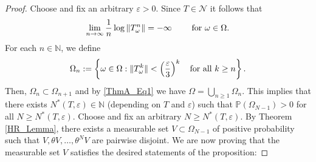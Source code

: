 \documentclass[pdflatex,sn-mathphys-num]{sn-jnl}%
\theoremstyle{thmstyleone}%
\theoremstyle{thmstyletwo}%
\theoremstyle{thmstylethree}%
\newcommand{\N}{\mathbb{N}}
\newcommand{\mP}{\mathbb{P}}
\newcommand{\eps}{\varepsilon}
\numberwithin{equation}{section}
\begin{document}
%
\begin{proof}
Choose and fix an arbitrary $\eps>0$. Since $T\in\mathcal N$ it follows that 
\begin{equation}\label{ThmA_Eq1}
\lim_{n\to\infty}\frac{1}{n}\log\|T_{\omega}^n\|=-\infty\qquad\hbox{ for } \omega \in \Omega.
\end{equation}
For each $n\in\N$, we define 
\begin{equation}\label{ThmA_Eq2}
\Omega_n:=\left\{\omega\in\Omega: \|T_{\omega}^k\|< \left(\frac{\eps}{3}\right)^k\quad \hbox{for all } k\geq n\right\}.
\end{equation}
Then, $\Omega_n\subset \Omega_{n+1}$ and by \eqref{ThmA_Eq1} we have $\Omega=\bigcup_{n\geq 1}\Omega_n$. This implies that there exists $N^*(T,\eps)\in\N$ (depending on $T$ and $\eps$) such that  $\mP(\Omega_{N-1})>0$ for all $N\geq N^*(T,\eps)$. Choose and fix an arbitrary $N\geq N^*(T,\eps)$. By Theorem \ref{HR_Lemma}, there exists a measurable set $V\subset \Omega_{N-1}$ of positive probability such that $V,\theta V,\dots, \theta^{N} V$ are pairwise disjoint.  We are now proving that the measurable set $V$ satisfies the desired statements of the proposition:


\end{proof}
\end{document}
